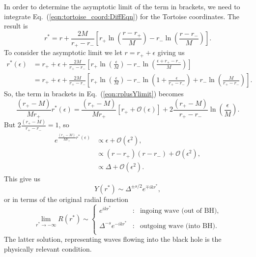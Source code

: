 \documentclass[11pt]{article}
\begin{document}
In order to determine the asymptotic limit of the term in brackets, we
need to integrate Eq.~(\ref{eqn:tortoise_coord:DiffEqn}) for the
Tortoise coordinates.  The result is
\begin{equation}\label{eqn:Tortose_coord}
  r^* = r + \frac{2M}{r_+-r_\minus}\left[
    r_+\ln\left(\frac{r-r_+}{M}\right) 
    - r_\minus\ln\left(\frac{r-r_\minus}{M}\right)\right].
\end{equation}
To consider the asymptotic limit we let $r=r_++\epsilon$ giving us
\begin{align}
   r^*(\epsilon) &= r_+ + \epsilon + \frac{2M}{r_+-r_\minus}\left[
    r_+\ln\left(\frac{\epsilon}{M}\right) 
    - r_\minus\ln\left(\frac{\epsilon +r_+-r_\minus}{M}\right)\right] \nonumber\\ 
   &= r_+ + \epsilon + \frac{2M}{r_+-r_\minus}\left[
    r_+\ln\left(\frac{\epsilon}{M}\right) 
    - r_\minus\ln\left(1+\frac{\epsilon}{r_+-r_\minus}\right)
   + r_\minus\ln\left(\frac{M}{r_+-r_\minus}\right)\right].
\end{align}
So, the term in brackets in Eq.~(\ref{eqn:rplusYlimit}) becomes
\begin{equation}
  \frac{(r_+-M)}{Mr_+}r^*(\epsilon) =
     \frac{(r_+-M)}{Mr_+}\left[r_+ + \mathcal{O}(\epsilon)\right]
     + 2\frac{(r_+-M)}{r_+-r_\minus}\ln\left(\frac\epsilon{M}\right).
\end{equation}
But $2\frac{(r_+-M)}{r_+-r_\minus}=1$, so
\begin{align}
  e^{\frac{(r_+-M)}{Mr_+}r^*(\epsilon)} &\propto \epsilon + \mathcal{O}(\epsilon^2), \\
       &\propto (r-r_+)(r-r_\minus) + \mathcal{O}(\epsilon^2), \\
       &\propto \Delta + \mathcal{O}(\epsilon^2).
\end{align}
This give us
\begin{equation}
   Y(r^*) \sim \Delta^{\pm{s}/2}e^{\mp{i}k{r^*}},
\end{equation}
or in terms of the original radial function
\begin{equation}
  \lim_{r^*\to-\infty}R(r^*) \sim \left\{\begin{array}{lcl}
      e^{ik{r^*}} &:& \mbox{ingoing wave (out of BH)}, \\ \\
     \Delta^{-s}e^{-ik{r^*}} &:& \mbox{outgoing wave (into BH)}. \\
   \end{array}\right.
\end{equation}
The latter solution, representing waves flowing into the black hole is the physically relevant condition.
\end{document}
